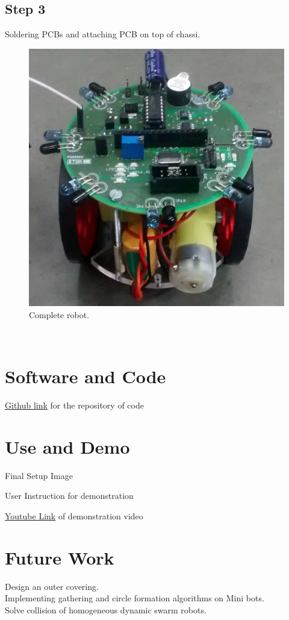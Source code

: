 \documentclass[a4paper,12pt,oneside]{book}
\begin{document}
\subsection*{Step 3}
Soldering PCBs and attaching PCB on top of chassi.
\hfill\\
\begin{figure}[h!]
	\caption{Complete robot.}
	\includegraphics[width=\textwidth]{./Pictures/version2_top}		
\end{figure}	
\hfill\\
\newpage
\section{Software and Code}
\href{https://github.com/eYSIP-2017/eYSIP-2017_DistributedRobotics.git}{Github link} for the repository of code

\section{Use and Demo}
Final Setup Image

User Instruction for demonstration

\href{http://www.youtube.com}{Youtube Link} of demonstration video 

\section{Future Work}
Design an outer covering.\\
Implementing gathering and circle formation algorithms on Mini bots.\\
Solve collision of homogeneous dynamic swarm robots.\\
\end{document}
